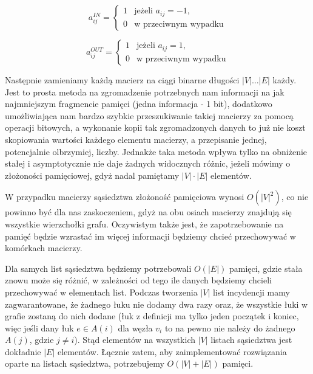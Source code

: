 \begin{equation}
	a^{IN}_{ij}= \left\{ 
	\begin{array}{ll}
	1 & \textrm{jeżeli $a_{ij} = -1$,}\\
	0 & \textrm{w przeciwnym wypadku}
	\end{array} \right.
\end{equation}

\begin{equation}
	a^{OUT}_{ij}= \left\{ 
	\begin{array}{ll}
	1 & \textrm{jeżeli $a_{ij} = 1$,}\\
	0 & \textrm{w przeciwnym wypadku}
	\end{array} \right.
\end{equation}

Następnie zamieniamy każdą macierz na ciągi binarne długości $ \left| V \right| \ldots \left| E \right| $ każdy. Jest to prosta metoda na zgromadzenie potrzebnych nam informacji na jak najmniejszym fragmencie pamięci (jedna informacja - 1 bit), dodatkowo umożliwiająca nam bardzo szybkie przeszukiwanie takiej macierzy za pomocą operacji bitowych, a wykonanie kopii tak zgromadzonych danych to już nie koszt skopiowania wartości każdego elementu macierzy, a przepisanie jednej, potencjalnie olbrzymiej, liczby. Jednakże taka metoda wpływa tylko na obniżenie stałej i asymptotycznie nie daje żadnych widocznych różnic, jeżeli mówimy o złożoności pamięciowej, gdyż nadal pamiętamy $\left| V \right| \cdot \left| E \right|$ elementów.

W przypadku macierzy sąsiedztwa złożoność pamięciowa wynosi $O \left( \left| V \right| ^{2} \right) $, co nie powinno być dla nas zaskoczeniem, gdyż na obu osiach macierzy znajdują się wszystkie wierzchołki grafu. Oczywistym także jest, że zapotrzebowanie na pamięć będzie wzrastać im więcej informacji będziemy chcieć przechowywać w komórkach macierzy.

Dla samych list sąsiedztwa będziemy potrzebowali $O \left( \left| E \right| \right) $ pamięci, gdzie stała znowu może się różnić, w zależności od tego ile danych będziemy chcieli przechowywać w elementach list. Podczas tworzenia $ \left| V \right| $ list incydencji mamy zagwarantowane, że żadnego łuku nie dodamy dwa razy oraz, że wszystkie łuki w grafie zostaną do nich dodane (łuk z definicji ma tylko jeden początek i koniec, więc jeśli dany łuk $e \in A \left( i \right)$ dla węzła $v_{i}$ to na pewno nie należy do żadnego $A \left( j \right)$, gdzie $j \neq i$). Stąd elementów na wszystkich $ \left| V \right| $ listach sąsiedztwa jest dokładnie $ \left| E \right| $ elementów. Łącznie zatem, aby zaimplementować rozwiązania oparte na listach sąsiedztwa, potrzebujemy $ O \left( \left| V \right| + \left| E \right| \right)$ pamięci.

